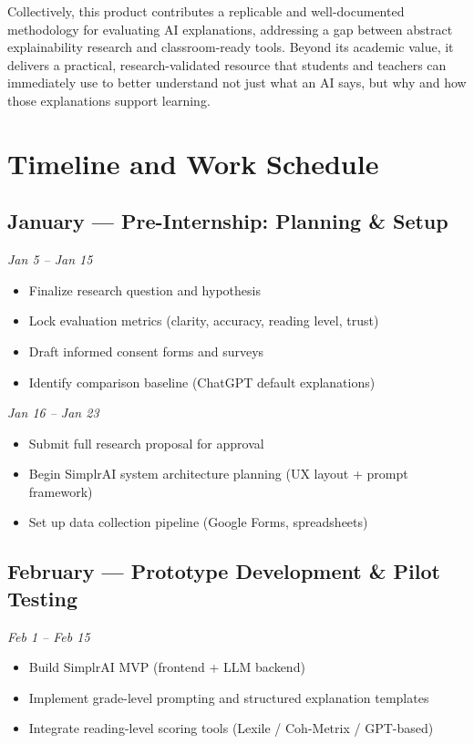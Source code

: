 \documentclass[11pt]{article}
\begin{document}
Collectively, this product contributes a replicable and well-documented
methodology for evaluating AI explanations, addressing a gap between abstract
explainability research and classroom-ready tools. Beyond its academic value,
it delivers a practical, research-validated resource that students and teachers
can immediately use to better understand not just what an AI says, but why and
how those explanations support learning.

\section*{Timeline and Work Schedule}

\subsection*{January --- Pre-Internship: Planning \& Setup}

\textit{Jan 5 -- Jan 15}
\begin{itemize}[leftmargin=1.6em,nosep]
  \item Finalize research question and hypothesis
  \item Lock evaluation metrics (clarity, accuracy, reading level, trust)
  \item Draft informed consent forms and surveys
  \item Identify comparison baseline (ChatGPT default explanations)
\end{itemize}

\textit{Jan 16 -- Jan 23}
\begin{itemize}[leftmargin=1.6em,nosep]
  \item Submit full research proposal for approval
  \item Begin SimplrAI system architecture planning (UX layout + prompt
  framework)
  \item Set up data collection pipeline (Google Forms, spreadsheets)
\end{itemize}

\subsection*{February --- Prototype Development \& Pilot Testing}

\textit{Feb 1 -- Feb 15}
\begin{itemize}[leftmargin=1.6em,nosep]
  \item Build SimplrAI MVP (frontend + LLM backend)
  \item Implement grade-level prompting and structured explanation templates
  \item Integrate reading-level scoring tools (Lexile / Coh-Metrix / GPT-based)
\end{itemize}
\end{document}
